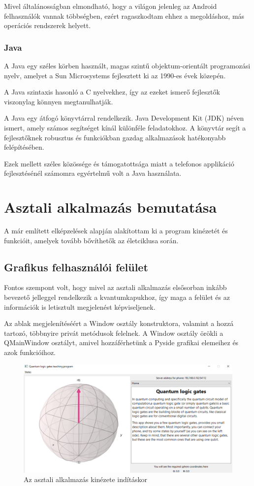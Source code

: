 \documentclass[
]{thesis-ekf}
\theoremstyle{definition}
\theoremstyle{remark}
\begin{document}
Mivel általánosságban elmondható, hogy a világon jelenleg az Android felhasználók vannak többségben, ezért ragaszkodtam ehhez a megoldáshoz, más operációs rendszerek helyett.

\subsubsection{Java}
A Java egy széles körben használt, magas szintű objektum-orientált programozási nyelv, amelyet a Sun Microsystems fejlesztett ki az 1990-es évek közepén. 

A Java szintaxis hasonló a C nyelvekhez, így az ezeket ismerő fejlesztők viszonylag könnyen megtanulhatják. 

A Java egy átfogó könyvtárral rendelkezik. Java Development Kit (JDK) néven ismert, amely számos segítséget kínál különféle feladatokhoz. A könyvtár segít a fejlesztőknek robusztus és funkciókban gazdag alkalmazások hatékonyabb felépítésében.

Ezek mellett széles közössége és támogatottsága miatt a telefonos applikáció fejlesztésénél számomra egyértelmű volt a Java használata.

\section{Asztali alkalmazás bemutatása}
A már említett elképzelések alapján alakítottam ki a program kinézetét és funkcióit, amelyek tovább bővíthetők az életciklusa során.

\subsection{Grafikus felhasználói felület}
Fontos szempont volt, hogy mivel az asztali alkalmazás elsősorban inkább bevezető jelleggel rendelkezik a kvantumkapukhoz, így maga a felület és az információk  is letisztult megjelenést képviseljenek.

Az ablak megjelenítéséért a Window osztály konstruktora, valamint a hozzá tartozó, többnyire privát metódusok felelnek. A Window osztály örökli a QMainWindow osztályt, amivel hozzáférhetünk a Pyside grafikai elemeihez és azok funkcióihoz.

\begin{figure}[H]
	\centering
	\includegraphics[width=0.6\linewidth]{Program}
	\caption{Az asztali alkalmazás kinézete indításkor}
	\label{fig:program}
\end{figure}
\end{document}
